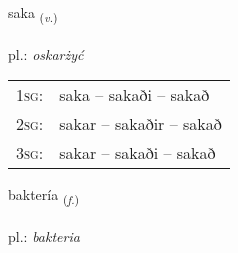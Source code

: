 \documentclass[frontgrid, backgrid]{flacards}\usepackage[]{graphicx}\usepackage[]{xcolor}
\begin{document}
\renewcommand{\flhead}{\vskip5pt \fboxsep=0pt {\small\bfseries\footnotesize Sagnorð | czasownik}}
\renewcommand{\fcfoot}{\vskip5pt \fboxsep=0pt \hspace{2pt}{\small\bfseries\footnotesize 3K}}

\renewcommand{\blhead}{\vskip5pt {\small\bfseries\footnotesize Sagnorð | czasownik }}
\renewcommand{\bcfoot}{\vskip5pt \hspace{2pt}{\small\bfseries\footnotesize 3K}}


{saka \small{\textsubscript{(\textit{v.})}} \\[1ex] %
\textphonetic{[saːka]} \\
pl.: \emph{oskarżyć} \\  [2ex]
\renewcommand*{\arraystretch}{0.8}
\begin{tabular}{p{1cm}l}
\textsc{1sg}: & saka -- sakaði -- sakað \\ 
\textsc{2sg}: & sakar -- sakaðir -- sakað \\ 
\textsc{3sg}: & sakar -- sakaði -- sakað \\ 
\end{tabular}
}

\renewcommand{\flhead}{\vskip5pt \fboxsep=0pt {\small\bfseries\footnotesize Nafnorð | rzeczownik}}
\renewcommand{\fcfoot}{\vskip5pt \fboxsep=0pt \hspace{2pt}{\small\bfseries\footnotesize 3K}}

\renewcommand{\blhead}{\vskip5pt {\small\bfseries\footnotesize Nafnorð | rzeczownik }}
\renewcommand{\bcfoot}{\vskip5pt \hspace{2pt}{\small\bfseries\footnotesize 3K}}


{baktería \small{\textsubscript{(\textit{f.})}} \\[1ex] %
\textphonetic{[paxtɛrija]} \\
pl.: \emph{bakteria} \\  [2ex]
\renewcommand*{\arraystretch}{0.8}
}
\end{document}
